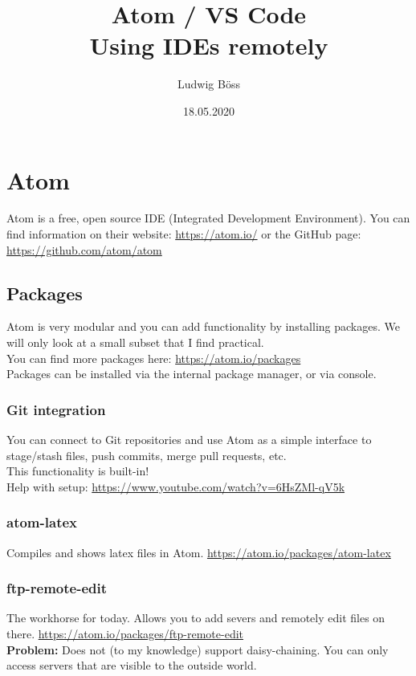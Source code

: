 \documentclass[10pt,a4paper]{article}
\title{Atom / VS Code\\Using IDEs remotely}
\date{18.05.2020}
\author{Ludwig Böss}
\begin{document}
\maketitle

\section{Atom}

Atom is a free, open source IDE (Integrated Development Environment). You can find information on their website: \url{https://atom.io/} or the GitHub page: \url{https://github.com/atom/atom}

\subsection{Packages}
Atom is very modular and you can add functionality by installing packages. We will only look at a small subset that I find practical.\\
You can find more packages here: \url{https://atom.io/packages}\\
Packages can be installed via the internal package manager, or via console.\\

\subsubsection{Git integration}
You can connect to Git repositories and use Atom as a simple interface to stage/stash files, push commits, merge pull requests, etc.\\
This functionality is built-in!\\
Help with setup: \url{https://www.youtube.com/watch?v=6HsZMl-qV5k}

\subsubsection{atom-latex}
Compiles and shows latex files in Atom. \url{https://atom.io/packages/atom-latex}

\subsubsection{ftp-remote-edit}
The workhorse for today. Allows you to add severs and remotely edit files on there.
\url{https://atom.io/packages/ftp-remote-edit}\\
\textbf{Problem:} Does not (to my knowledge) support daisy-chaining. You can only access servers that are visible to the outside world.
\end{document}
